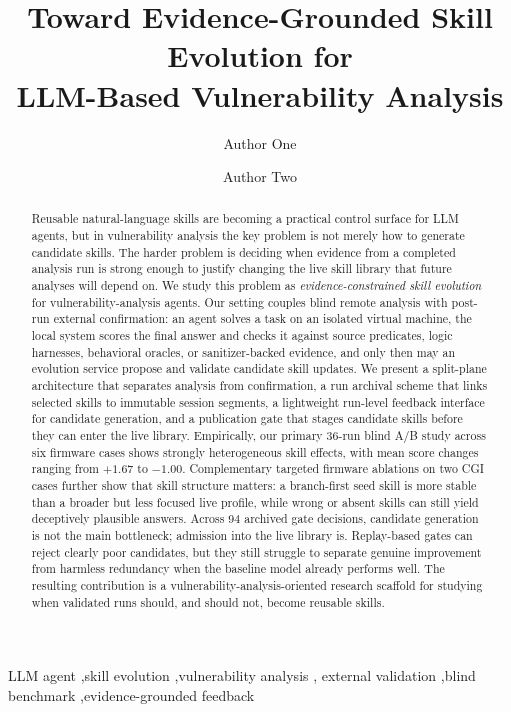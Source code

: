 ﻿\documentclass[preprint,12pt]{elsarticle}
\begin{document}
\begin{frontmatter}

\title{Toward Evidence-Grounded Skill Evolution for\\
LLM-Based Vulnerability Analysis}

\author[inst1]{Author One}
\author[inst1]{Author Two}
\address[inst1]{Affiliation, City, Country}

\begin{abstract}
Reusable natural-language skills are becoming a practical control surface
for LLM agents, but in vulnerability analysis the key problem is not merely
how to generate candidate skills.  The harder problem is deciding when
evidence from a completed analysis run is strong enough to justify changing
the live skill library that future analyses will depend on.  We study this
problem as \emph{evidence-constrained skill evolution} for
vulnerability-analysis agents.  Our setting couples blind remote analysis
with post-run external confirmation: an agent solves a task on an isolated
virtual machine, the local system scores the final answer and checks it
against source predicates, logic harnesses, behavioral oracles, or
sanitizer-backed evidence, and only then may an evolution service propose
and validate candidate skill updates.  We present a split-plane
architecture that separates analysis from confirmation, a run archival
scheme that links selected skills to immutable session segments, a
lightweight run-level feedback interface for candidate generation, and a
publication gate that stages candidate skills before they can enter the
live library.  Empirically, our primary 36-run blind A/B study across six
firmware cases shows strongly heterogeneous skill effects, with mean score
changes ranging from $+1.67$ to $-1.00$.  Complementary targeted firmware
ablations on two CGI cases further show that skill structure matters: a
branch-first seed skill is more stable than a broader but less focused live
profile, while wrong or absent skills can still yield deceptively plausible
answers.  Across 94 archived gate decisions, candidate generation is not
the main bottleneck; admission into the live library is.  Replay-based
gates can reject clearly poor candidates, but they still struggle to
separate genuine improvement from harmless redundancy when the baseline
model already performs well.  The resulting contribution is a
vulnerability-analysis-oriented research scaffold for studying when
validated runs should, and should not, become reusable skills.
\end{abstract}

\begin{keyword}
LLM agent \sep skill evolution \sep vulnerability analysis \sep
external validation \sep blind benchmark \sep evidence-grounded feedback
\end{keyword}

\end{frontmatter}
\end{document}
